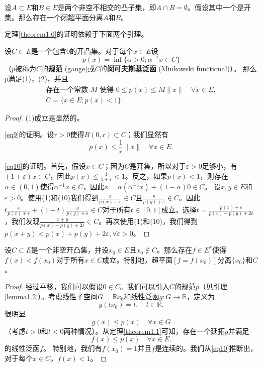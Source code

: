 \begin{theorem}\label{theorem1.6}
设$A \subset E$和$B \in E$是两个非空不相交的凸子集，即$A \cap B = \emptyset$。假设其中一个是开集。那么存在一个闭超平面分离$A$和$B$。
\end{theorem}

定理\ref{theorem1.6}的证明依赖于下面两个引理。

\begin{lemma}\label{lemma1.2}
设$C \subset E$是一个包含$0$的开凸集。对于每个$x \in E$设
\begin{equation}\label{eq8}
p(x) = \inf\{\alpha > 0; \alpha^{-1}x \in C\}
\end{equation}
（$p$被称为$C$的\textbf{规范} (gauge)或$C$的\textbf{闵可夫斯基泛函} (Minkowski functional)）。
那么$p$满足(1)，(2)，并且
\begin{gather}
\text{存在一个常数 } M \text{ 使得 } 0 \leq p(x) \leq M\|x\| \quad \forall x \in E, \label{eq9} \\
C = \{x \in E; p(x) < 1\}. \label{eq10}
\end{gather}
\end{lemma}
\begin{proof}
(1)成立是显然的。

\eqref{eq9}的证明。设$r>0$使得$B(0, r) \subset C$；我们显然有
\[ p(x) \leq \frac{1}{r}\|x\| \quad \forall x \in E. \]

\eqref{eq10}的证明。首先，假设$x \in C$；因为$C$是开集，所以对于$\varepsilon>0$足够小，有$(1+\varepsilon)x \in C$，因此$p(x) \leq \frac{1}{1+\varepsilon} < 1$。反之，如果$p(x) < 1$，则存在$\alpha \in (0, 1)$使得$\alpha^{-1}x \in C$，因此$x = \alpha(\alpha^{-1}x) + (1-\alpha)0 \in C$。
设$x, y \in E$和$\varepsilon > 0$。使用(1)和(10)我们得到$\frac{x}{p(x)+\varepsilon} \in C$且$\frac{y}{p(y)+\varepsilon} \in C$。因此$t\frac{x}{p(x)+\varepsilon} + (1-t)\frac{y}{p(y)+\varepsilon} \in C$对于所有$t \in [0, 1]$成立。选择$t=\frac{p(x)+\varepsilon}{p(x)+p(y)+2\varepsilon}$，我们发现$\frac{x+y}{p(x)+p(y)+2\varepsilon} \in C$。再次使用(1)和(10)，我们得到$p(x+y) < p(x)+p(y)+2\varepsilon, \forall \varepsilon > 0$。
\end{proof}

\begin{lemma}\label{lemma1.3}
设$C \subset E$是一个非空开凸集，并设$x_0 \in E$且$x_0 \notin C$。那么存在$f \in E^*$使得$f(x) < f(x_0)$对于所有$x \in C$成立。特别地，超平面$[f = f(x_0)]$分离$\{x_0\}$和$C$。
\end{lemma}
\begin{proof}
经过平移，我们可以假设$0 \in C$。我们可以引入$C$的规范$p$（见引理\ref{lemma1.2}）。考虑线性子空间$G = \mathbb{R}x_0$和线性泛函$g: G \to \mathbb{R}$，定义为
\[ g(tx_0) = t, \quad t \in \mathbb{R}. \]
很明显
\[ g(x) \leq p(x) \quad \forall x \in G \]
（考虑$t>0$和$t<0$两种情况）。从定理\ref{theorem1.1}可知，存在一个延拓$g$并满足
\[ f(x) \leq p(x) \quad \forall x \in E. \]
的线性泛函$f$。
特别地，我们有$f(x_0)=1$并且$f$是连续的。我们从\eqref{eq10}推断出，对于每个$x \in C$，$f(x) < 1$。
\end{proof}

